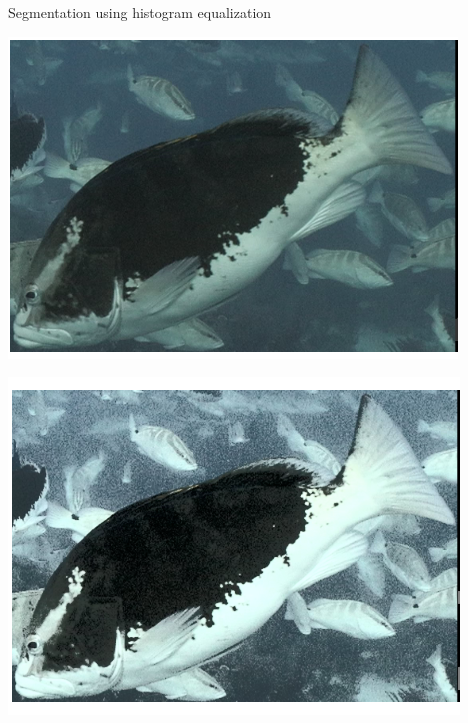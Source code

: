 


\begin{frame}{Segmentation using histogram equalization}
    \begin{minipage}{0.5\textwidth}
        \centering
        \includegraphics[height=0.7\textheight,keepaspectratio]{images/gm4-1.png}
    \end{minipage}%
    \begin{minipage}{0.5\textwidth}
        \centering
        \includegraphics[height=0.7\textheight,keepaspectratio]{images/gm4-2.png}
    \end{minipage}
\end{frame}

